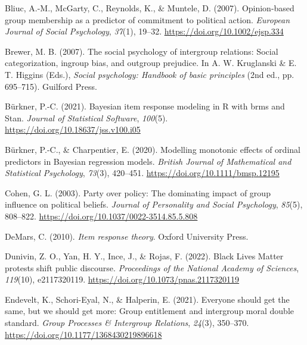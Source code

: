 \documentclass[12pt, letterpaper]{article}
\newenvironment{CSLReferences}[2]{}{}
\begin{document}
\begin{CSLReferences}{1}{0}
\leavevmode{}%
Bliuc, A.-M., McGarty, C., Reynolds, K., \& Muntele, D. (2007).
Opinion-based group membership as a predictor of commitment to political
action. \emph{European Journal of Social Psychology}, \emph{37}(1),
19--32. \url{https://doi.org/10.1002/ejsp.334}

\leavevmode{}%
Brewer, M. B. (2007). The social psychology of intergroup relations:
Social categorization, ingroup bias, and outgroup prejudice. In A. W.
Kruglanski \& E. T. Higgins (Eds.), \emph{Social psychology: Handbook of
basic principles} (2nd ed., pp. 695--715). Guilford Press.

\leavevmode{}%
Bürkner, P.-C. (2021). Bayesian item response modeling in {R} with brms
and {Stan}. \emph{Journal of Statistical Software}, \emph{100}(5).
\url{https://doi.org/10.18637/jss.v100.i05}

\leavevmode{}%
Bürkner, P.-C., \& Charpentier, E. (2020). Modelling monotonic effects
of ordinal predictors in {Bayesian} regression models. \emph{British
Journal of Mathematical and Statistical Psychology}, \emph{73}(3),
420--451. \url{https://doi.org/10.1111/bmsp.12195}

\leavevmode{}%
Cohen, G. L. (2003). Party over policy: The dominating impact of group
influence on political beliefs. \emph{Journal of Personality and Social
Psychology}, \emph{85}(5), 808--822.
\url{https://doi.org/10.1037/0022-3514.85.5.808}

\leavevmode{}%
DeMars, C. (2010). \emph{Item response theory}. Oxford University Press.

\leavevmode{}%
Dunivin, Z. O., Yan, H. Y., Ince, J., \& Rojas, F. (2022). Black {Lives}
{Matter} protests shift public discourse. \emph{Proceedings of the
National Academy of Sciences}, \emph{119}(10), e2117320119.
\url{https://doi.org/10.1073/pnas.2117320119}

\leavevmode{}%
Endevelt, K., Schori-Eyal, N., \& Halperin, E. (2021). Everyone should
get the same, but we should get more: Group entitlement and intergroup
moral double standard. \emph{Group Processes \& Intergroup Relations},
\emph{24}(3), 350--370. \url{https://doi.org/10.1177/1368430219896618}


\end{CSLReferences}
\end{document}
